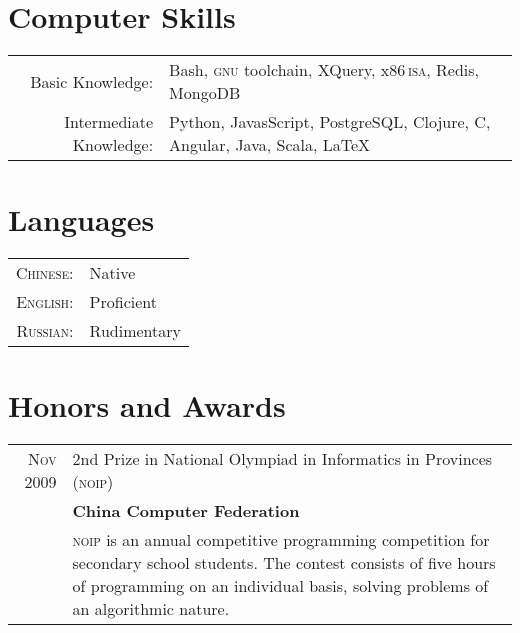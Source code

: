 \documentclass[a4paper,11pt]{article}
\begin{document}
\section{Computer Skills}
\begin{tabular}{rp{9cm}}
  Basic Knowledge:& Bash, \textsc{gnu} toolchain, XQuery, x86\,\textsc{isa}, Redis, MongoDB\\
  Intermediate Knowledge:& Python, JavasScript, PostgreSQL, Clojure, C, Angular, Java, Scala, \LaTeX
\end{tabular}

\section{Languages}
\begin{tabular}{rl}
  \textsc{Chinese:} & Native\\
  \textsc{English:} & Proficient\\
  \textsc{Russian:} & Rudimentary
\end{tabular}

\section{Honors and Awards}
\begin{tabular}{rp{11.6cm}}
  \textsc{Nov 2009} & 2nd Prize in National Olympiad in Informatics in Provinces (\textsc{noip})\\
                    & \textbf{China Computer Federation}\\
                    & \footnotesize \textsc{noip} is an annual competitive programming competition for secondary school students.  The contest consists of five hours of programming on an individual basis, solving problems of an algorithmic nature.
\end{tabular}
\end{document}

